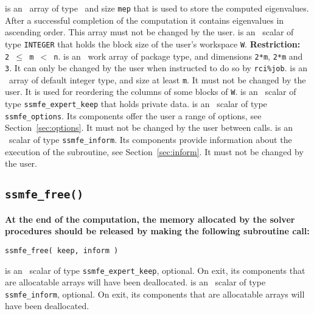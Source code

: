 \begin{description}
%
 is an \intentinout\
array of type \REALDP\
and size {\tt mep} that is
used to store the computed eigenvalues.
After a successful completion of the computation
it contains eigenvalues in ascending order.
This array must not be changed by the user.
%
 is an \intentin\ scalar of type {\tt INTEGER} that
holds the block size of the user's workspace {\tt W}. 
{\bf Restriction:} \\{\tt 2 $\le$ m $<$ n}.
%
 is an \intentinout\
work array of package type,
and dimensions {\tt 2*m}, {\tt 2*m} and {\tt 3}.
It can only be changed by the user when
instructed to do so by 
{\tt rci\%job}.
%
 is an \intentinout\ 
array of default integer type, and size at least {\tt m}. 
It must not be changed by the user.
It is used for reordering the columns of some blocks of {\tt W}.
%
\itt{keep} is an \intentinout\ scalar of type 
{\tt ssmfe\_expert\_keep} 
that holds private data. 
%
\itt{options} is an \intentin\  scalar  of type {\tt ssmfe\_options}.
Its components offer the user a range of options,
see Section~\ref{sec:options}.
It must not be changed by the user between calls.
%
\itt{inform} is an \intentinout\ scalar of type 
{\tt ssmfe\_inform}. Its components provide information about the execution
of the subroutine, see Section~\ref{sec:inform}.
It must not be changed by the user.
%
\end{description}

\subsection{\texttt{ssmfe\_free()}}

{\bf
At the end of the computation, the memory 
allocated by the solver procedures
should be released
by making the following subroutine call:
}

\medskip

\hspace{8mm} {\tt ssmfe\_free( keep, inform )}

\begin{description}
%
\itt{keep} is an \intentinout\ scalar of type 
{\tt ssmfe\_expert\_keep}, optional. 
On exit, its components that are allocatable arrays will have been deallocated. 
%
\itt{inform} is an \intentinout\ scalar of type {\tt ssmfe\_inform}, 
optional.
On exit, its components that are allocatable arrays will have been deallocated. 
%
\end{description}

